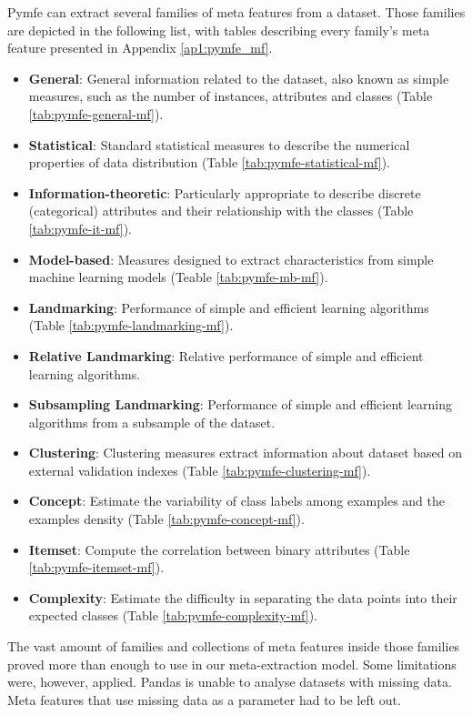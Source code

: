 Pymfe can extract several families of meta features from a dataset. Those families are depicted in the following list, with tables describing every family's meta feature presented in Appendix \ref{ap1:pymfe_mf}.
\begin{itemize}
  \item \textbf{General}: General information related to the dataset, also known as simple measures, such as the number of instances, attributes and classes (Table \ref{tab:pymfe-general-mf}).
  \item \textbf{Statistical}: Standard statistical measures to describe the numerical properties of data distribution (Table \ref{tab:pymfe-statistical-mf}).
  \item \textbf{Information-theoretic}: Particularly appropriate to describe discrete (categorical) attributes and their relationship with the classes (Table \ref{tab:pymfe-it-mf}).
  \item \textbf{Model-based}: Measures designed to extract characteristics from simple machine learning models (Teable \ref{tab:pymfe-mb-mf}).
  \item \textbf{Landmarking}: Performance of simple and efficient learning algorithms (Table \ref{tab:pymfe-landmarking-mf}).
  \item \textbf{Relative Landmarking}: Relative performance of simple and efficient learning algorithms.
  \item \textbf{Subsampling Landmarking}: Performance of simple and efficient learning algorithms from a subsample of the dataset.
  \item \textbf{Clustering}: Clustering measures extract information about dataset based on external validation indexes (Table \ref{tab:pymfe-clustering-mf}).
  \item \textbf{Concept}: Estimate the variability of class labels among examples and the examples density (Table \ref{tab:pymfe-concept-mf}).
  \item \textbf{Itemset}: Compute the correlation between binary attributes (Table \ref{tab:pymfe-itemset-mf}).
  \item \textbf{Complexity}: Estimate the difficulty in separating the data points into their expected classes (Table \ref{tab:pymfe-complexity-mf}).
\end{itemize}

The vast amount of families and collections of meta features inside those families proved more than enough to use in our meta-extraction model. Some limitations were, however, applied. Pandas is unable to analyse datasets with missing data. Meta features that use missing data as a parameter had to be left out.

